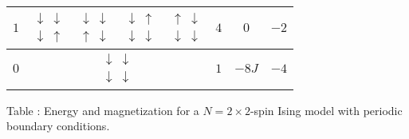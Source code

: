 \documentclass[a4paper, twoside, 11pt]{report}
\theoremstyle{theorem}
\theoremstyle{remark}
\theoremstyle{exemple}
\begin{document}
\begin{center}
\begin{tabular}{|*{8}{c|}}
                            \hline
                        $1$ & $\begin{matrix}
                            \downarrow & \downarrow \\
                            \downarrow & \uparrow
                        \end{matrix}$ & $\begin{matrix}
                                            \downarrow & \downarrow \\
                                            \uparrow & \downarrow
                                         \end{matrix}$ & $\begin{matrix}
                                                               \downarrow & \uparrow \\
                                                               \downarrow & \downarrow
                                                           \end{matrix}$ & $\begin{matrix}
                                                                                \uparrow & \downarrow \\
                                                                                \downarrow & \downarrow
                                                                            \end{matrix}$ & $4$ & $0$ & $-2$ \\
                            \hline
                        $0$ & \multicolumn{4}{c|}{$\begin{matrix}
                                                       \downarrow & \downarrow \\
                                                       \downarrow & \downarrow
                                                     \end{matrix}$} & $1$ & $-8J$ & $-4$ \\
                            \hline            
                    \end{tabular}
                    Table : Energy and magnetization for a $N = 2\times 2$-spin Ising model with periodic boundary conditions.
                \end{center}
            
\end{document}
